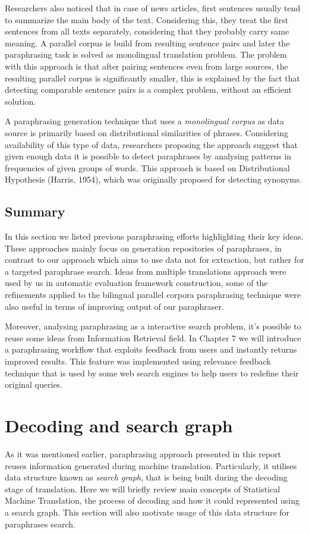 Researchers also noticed that in case of news articles, first sentences usually tend to summarize the main body of the text. Considering this, they treat the first sentences from all texts separately, considering that they probably carry same meaning. A parallel corpus is build from resulting sentence pairs and later the paraphrasing task is solved as monolingual translation problem. The problem with this approach is that after pairing sentences even from large sources, the resulting parallel corpus is significantly smaller, this is explained by the fact that detecting comparable sentence pairs is a complex problem, without an efficient solution.

A paraphrasing generation technique that uses a \textit{monolingual corpus} as data source is primarily based on distributional similarities of phrases. Considering availability of this type of data, researchers proposing the approach suggest that given enough data it is possible to detect paraphrases by analysing patterns in frequencies of given groups of words. This approach is based on Distributional Hypothesis (Harris, 1954), which was originally proposed for detecting synonyms.


\subsection{Summary}

In this section we listed previous paraphrasing efforts highlighting their key ideas. These approaches mainly focus on generation repositories of paraphrases, in contrast to our approach which aims to use data not for extraction, but rather for a targeted paraphrase search. Ideas from multiple translations approach were used by us in automatic evaluation framework construction, some of the refinements applied to the bilingual parallel corpora paraphrasing technique were also useful in terms of improving output of our paraphraser.

Moreover, analysing paraphrasing as a interactive search problem, it's possible to reuse some ideas from Information Retrieval field. In Chapter 7 we will introduce a paraphrasing workflow that exploits feedback from users and instantly returns improved results. This feature was implemented using relevance feedback technique that is used by some web search engines to help users to redefine their original queries.  


\section{Decoding and search graph}
As it was mentioned earlier, paraphrasing approach presented in this report reuses information generated during machine translation. Particularly, it utilises data structure known as \textit{search graph}, that is being built during the decoding stage of translation. Here we will briefly review main concepts of Statistical Machine Translation, the process of decoding and how it could represented using a search graph. This section will also motivate usage of this data structure for paraphrases search.

